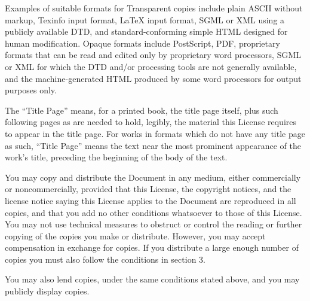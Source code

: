     
    

      Examples of suitable formats for Transparent copies include
      plain ASCII without markup, Texinfo input format, LaTeX input
      format, SGML or XML using a publicly available DTD, and
      standard-conforming simple HTML designed for human
      modification. Opaque formats include PostScript, PDF,
      proprietary formats that can be read and edited only by
      proprietary word processors, SGML or XML for which the DTD
      and/or processing tools are not generally available, and the
      machine-generated HTML produced by some word processors for
      output purposes only.
    

    
    

      The ``Title Page'' means, for a printed book, the
      title page itself, plus such following pages as are needed to
      hold, legibly, the material this License requires to appear in
      the title page. For works in formats which do not have any title
      page as such, ``Title Page'' means the text near the
      most prominent appearance of the work's title, preceding the
      beginning of the body of the text.
    

   
	


    

      You may copy and distribute the Document in any medium, either
      commercially or noncommercially, provided that this License, the
      copyright notices, and the license notice saying this License
      applies to the Document are reproduced in all copies, and that
      you add no other conditions whatsoever to those of this
      License. You may not use technical measures to obstruct or
      control the reading or further copying of the copies you make or
      distribute. However, you may accept compensation in exchange for
      copies. If you distribute a large enough number of copies you
      must also follow the conditions in 
      section 3.
    

    
    

      You may also lend copies, under the same conditions stated
      above, and you may publicly display copies.
    

    
    


